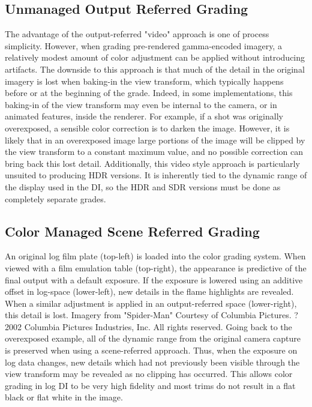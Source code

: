 \subsection{Unmanaged Output Referred Grading}%
\label{subsec:unmanaged-output-referred-grading}

The advantage of the output-referred "video" approach is one of process simplicity. However, when grading pre-rendered gamma-encoded imagery, a relatively modest amount of color adjustment can be applied without introducing artifacts. The downside to this approach is that much of the detail in the original imagery is lost when baking-in the view transform, which typically happens before or at the beginning of the grade. Indeed, in some implementations, this baking-in of the view transform may even be internal to the camera, or in animated features, inside the renderer. For example, if a shot was originally overexposed, a sensible color correction is to darken the image. However, it is likely that in an overexposed image large portions of the image will be clipped by the view transform to a constant maximum value, and no possible correction can bring back this lost detail. Additionally, this video style approach is particularly unsuited to producing HDR versions. It is inherently tied to the dynamic range of the display used in the DI, so the HDR and SDR versions must be done as completely separate grades.

\subsection{Color Managed Scene Referred Grading}%
\label{subsec:color-managed-scene-referred-grading}




An original log film plate (top-left) is loaded into the color grading system. When viewed with a film emulation table (top-right), the appearance is predictive of the final output with a default exposure. If the exposure is lowered using an additive offset in log-space (lower-left), new details in the flame highlights are revealed. When a similar adjustment is applied in an output-referred space (lower-right), this detail is lost.
 Imagery from "Spider-Man" Courtesy of Columbia Pictures. ? 2002 Columbia Pictures Industries, Inc. All rights reserved.
Going back to the overexposed example, all of the dynamic range from the original camera capture is preserved when using a scene-referred approach. Thus, when the exposure on log data changes, new details which had not previously been visible through the view transform may be revealed as no clipping has occurred. This allows color grading in log DI to be very high fidelity and most trims do not result in a flat black or flat white in the image.

